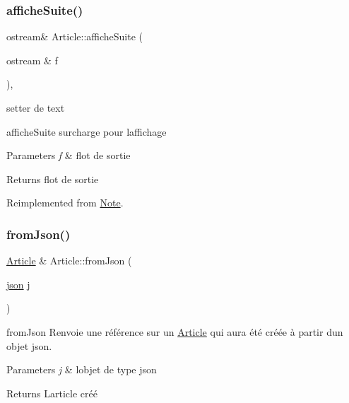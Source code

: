 \subsubsection{\texorpdfstring{affiche\+Suite()}{afficheSuite()}}
{\footnotesize\ttfamily ostream\& Article\+::affiche\+Suite (\begin{DoxyParamCaption}\item[{ostream \&}]{f }\end{DoxyParamCaption})\hspace{0.3cm}{\ttfamily [inline]}, {\ttfamily [virtual]}}



setter de text 

affiche\+Suite surcharge pour l\textquotesingle{}affichage 
\begin{DoxyParams}{Parameters}
{\em f} & flot de sortie \\
\hline
\end{DoxyParams}
\begin{DoxyReturn}{Returns}
flot de sortie 
\end{DoxyReturn}


Reimplemented from \hyperlink{classNote_ad3c0d7e48ef8244ead577128993a6f1f}{Note}.

\mbox{\label{classArticle_a6c17d092d93e155dbd7f8a7fa037ff61}} 
\subsubsection{\texorpdfstring{from\+Json()}{fromJson()}}
{\footnotesize\ttfamily \hyperlink{classArticle}{Article} \& Article\+::from\+Json (\begin{DoxyParamCaption}\item[{\hyperlink{classnlohmann_1_1basic__json}{json}}]{j }\end{DoxyParamCaption})\hspace{0.3cm}{\ttfamily [static]}}



from\+Json Renvoie une référence sur un \hyperlink{classArticle}{Article} qui aura été créée à partir d\textquotesingle{}un objet json. 


\begin{DoxyParams}{Parameters}
{\em j} & l\textquotesingle{}objet de type json \\
\hline
\end{DoxyParams}
\begin{DoxyReturn}{Returns}
L\textquotesingle{}article créé 
\end{DoxyReturn}
\mbox{\label{classArticle_aaddf8d9717ead08fce20be1052af82c9}} 
